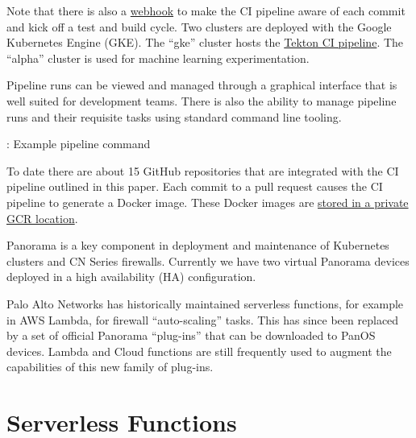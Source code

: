 \justifying
Note that there is also a \href{https://docs.github.com/en/developers/webhooks-and-events/webhooks/about-webhooks}{webhook} to make the CI pipeline
aware of each commit and kick off a test and build cycle.
\vspace{2mm}
\justifying
{}
\vspace{2mm}
\justifying
Two clusters are deployed with the Google Kubernetes Engine (GKE). The ``gke'' cluster hosts the \href{https://tekton.dev/}{Tekton CI pipeline}.
The ``alpha'' cluster is used for machine learning experimentation.


\justifying
Pipeline runs can be viewed and managed through a graphical interface that is well suited for development teams. There is
also the ability to manage pipeline runs and their requisite tasks using standard command line tooling.

\begin{mybox}{\thetcbcounter: Example pipeline command}
	
\end{mybox}
\vspace{2mm}

\vspace{2mm}

\justifying
To date there are about 15 GitHub repositories that are integrated with the CI pipeline outlined in this paper. Each commit
to a pull request causes the CI pipeline to generate a Docker image. These Docker images 
are \href{https://cloud.google.com/container-registry/}{stored in a private GCR location}.
\vspace{2mm}

\vspace{2mm}

\justifying
Panorama is a key component in deployment and maintenance of Kubernetes clusters and CN Series firewalls. Currently we have
two virtual Panorama devices deployed in a high availability (HA) configuration.

\justifying
Palo Alto Networks has historically maintained serverless functions, for example in AWS Lambda, for firewall ``auto-scaling'' tasks. This has since been
replaced by a set of official Panorama ``plug-ins'' that can be downloaded to PanOS devices. Lambda and Cloud functions
are still frequently used to augment the capabilities of this new family of plug-ins.
\vspace{2mm}


\section{\label{sec:SRV}Serverless Functions}
\vspace{2mm}

